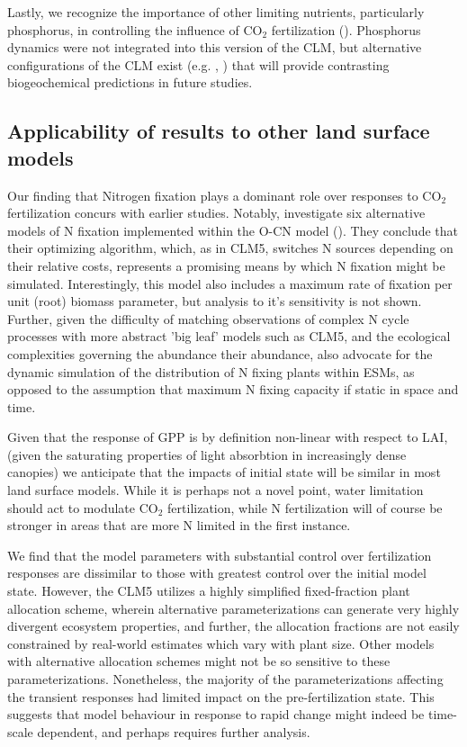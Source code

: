 \documentclass[draft,linenumbers]{agujournal}
\begin{document}
Lastly, we recognize the importance of other limiting nutrients, particularly phosphorus, in controlling the influence of CO$_{2}$ fertilization (\cite{reed2015}). Phosphorus dynamics were not integrated into this version of the CLM, but alternative configurations of the CLM exist (e.g. \cite{yang2014}, \cite{zhu2016}) that will provide contrasting biogeochemical predictions in future studies.  

\subsection{Applicability of results to other land surface models}
Our finding that Nitrogen fixation plays a dominant role over responses to CO$_{2}$ fertilization concurs with earlier studies. Notably, \cite{meyerholt2015} investigate six alternative models of N fixation implemented within the O-CN model (\cite{zaehle2010}). They conclude that their optimizing algorithm, which, as in CLM5, switches N sources depending on their relative costs, represents a promising means by which N fixation might be simulated. Interestingly, this model also includes a maximum rate of fixation per unit (root) biomass parameter, but analysis to it's sensitivity is not shown. Further, given the difficulty of matching observations of complex N cycle processes with more abstract 'big leaf' models such as CLM5, and the ecological complexities governing the abundance their abundance, \cite{meyerholt2015} also advocate for the dynamic simulation of the distribution of N fixing plants within ESMs, as opposed to the assumption that maximum N fixing capacity if static in space and time. 

Given that the response of GPP is by definition non-linear with respect to LAI, (given the saturating properties of light absorbtion in increasingly dense canopies) we anticipate that the impacts of initial state will be similar in most land surface models. While it is perhaps not a novel point, water limitation should act to modulate CO$_{2}$ fertilization, while N fertilization will of course be stronger in areas that are more N limited in the first instance.  

We find that the model parameters with substantial control over fertilization responses are dissimilar to those with greatest control over the initial model state. However, the CLM5 utilizes a highly simplified fixed-fraction plant allocation scheme, wherein alternative parameterizations can generate very highly divergent ecosystem properties, and further, the allocation fractions are not easily constrained by real-world estimates which vary with plant size. Other models with alternative allocation schemes might not be so sensitive to these parameterizations. Nonetheless, the majority of the parameterizations affecting the transient responses had limited impact on the pre-fertilization state. This suggests that model behaviour in response to rapid change might indeed be time-scale dependent, and perhaps requires further analysis. 
\end{document}
